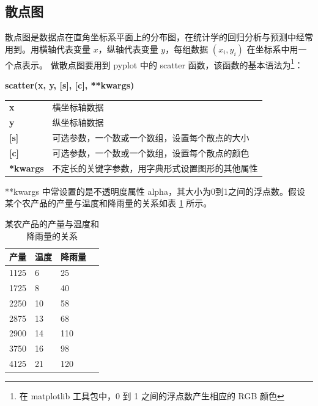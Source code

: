 \subsection{散点图}

散点图是数据点在直角坐标系平面上的分布图，在统计学的回归分析与预测中经常用到。用横轴代表变量 $x$，纵轴代表变量 $y$，每组数据 $(x_i, y_i)$ 在坐标系中用一个点表示。
做散点图要用到 pyplot 中的 scatter 函数，该函数的基本语法为\footnote{在 matplotlib 工具包中，0 到 1 之间的浮点数产生相应的 RGB 颜色}：

\begin{center}
\begin{tcolorbox}[title = scatter 函数的语法]
\textbf{scatter(x, y, [s], [c], **kwargs)}
\tcblower
\vspace{10pt}

\begin{tcboutputlisting}
\begin{tabular}{>{\bfseries}ll}
  x &横坐标轴数据\\
  y & 纵坐标轴数据\\

[s] &可选参数，一个数或一个数组，设置每个散点的大小\\

[c] &可选参数，一个数或一个数组，设置每个散点的颜色\\
**kwargs &不定长的关键字参数，用字典形式设置图形的其他属性
\end{tabular}
\end{tcboutputlisting}
\tcbuselistingtext

\end{tcolorbox}
\end{center}

**kwargs 中常设置的是不透明度属性 alpha，其大小为0到1之间的浮点数。假设某个农产品的产量与温度和降雨量的关系如表 \ref{table:scatter} 所示。

\begin{table}[!ht]
\centering
\renewcommand{\arraystretch}{1.2}
\caption{某农产品的产量与温度和降雨量的关系}\label{table:scatter}
\begin{tabular}{|l|l|l|l|}
\hline
产量 & 温度 & 降雨量 \\ \hline
1125 & 6 & 25 \\ \hline
1725 & 8 & 40 \\ \hline
2250 & 10 & 58 \\ \hline
2875 & 13 & 68 \\ \hline
2900 & 14 & 110 \\ \hline
3750 & 16 & 98 \\ \hline
4125 & 21 & 120 \\ \hline

\end{tabular}
\end{table}

